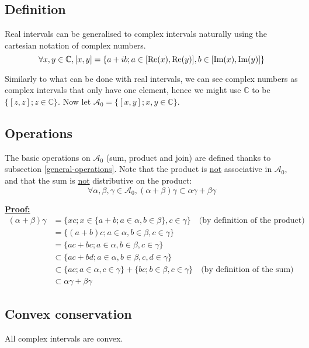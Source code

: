 \subsection{Definition}

Real intervals can be generalised to complex intervals naturally using the cartesian notation of complex numbers.
$$\forall x, y \in \mathbb{C}, [x, y]
= \{a + ib ; a \in [\mathrm{Re}(x), \mathrm{Re}(y)], b \in [\mathrm{Im}(x), \mathrm{Im}(y)]\}$$

Similarly to what can be done with real intervals, we can see complex numbers as complex intervals that only have one element, hence we might use $\mathbb{C}$ to be $\{[z, z] ; z \in \mathbb{C}\}$. Now let $\mathcal{A}_0 = \{[x, y] ; x, y \in \mathbb{C}\}$.

\subsection{Operations}

The basic operations on $\mathcal{A}_0$ (sum, product and join) are defined thanks to subsection \ref{general-operations}. Note that the product is \underline{not} associative in $\mathcal{A}_0$, and that the sum is \underline{not} distributive on the product:
$$\forall \alpha, \beta, \gamma \in \mathcal{A}_0, (\alpha + \beta) \gamma \subset \alpha \gamma + \beta \gamma$$

\noindent \underline{\textbf{Proof:}}
\begin{align*}
(\alpha + \beta)\gamma &= \{xc ; x \in \{a + b ; a \in \alpha, b \in \beta\}, c \in \gamma\} \quad \text{(by definition of the product)}\\
&= \{(a + b)c ; a \in \alpha, b \in \beta, c \in \gamma\} \\
&= \{ac + bc ; a \in \alpha, b \in \beta, c \in \gamma\} \\
&\subset \{ac + bd ; a \in \alpha, b \in \beta, c, d \in \gamma\} \\
&\subset \{ac; a \in \alpha, c \in \gamma\} + \{bc ; b \in \beta, c \in \gamma\} \quad \text{(by definition of the sum)} \\
&\subset \alpha \gamma + \beta \gamma
\end{align*}
\hfill{} $\boxed{}$

\subsection{Convex conservation}

All complex intervals are convex.

